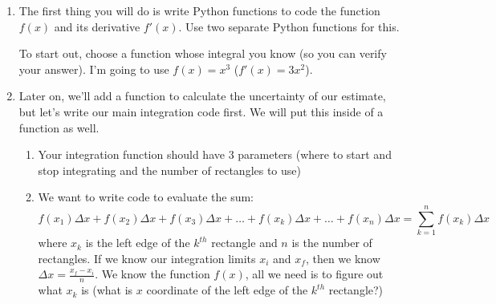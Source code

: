 \documentclass{article}
\begin{document}
\begin{enumerate}
	\item The first thing you will do is write Python functions to code the function $f(x)$ and its derivative $f'(x)$. Use two separate Python functions for this. 
	
	To start out, choose a function whose integral you know (so you can verify your answer). I'm going to use $f(x)=x^3$ ($f'(x)=3x^2$).
	\item Later on, we'll add a function to calculate the uncertainty of our estimate, but let's write our main integration code first. We will put this inside of a function as well.
	\begin{enumerate}
		\item Your integration function should have 3 parameters (where to start and stop integrating and the number of rectangles to use)
		\item We want to write code to evaluate the sum: 
		\begin{equation*}
			f(x_1)\Delta x + f(x_2)\Delta x + f(x_3)\Delta x+\ldots+f(x_k)\Delta x+\ldots+f(x_n)\Delta x = \sum_{k=1}^{n}f(x_k)\Delta x
		\end{equation*}
		where $x_k$ is the left edge of the $k^{th}$ rectangle and $n$ is the number of rectangles. If we know our integration limits $x_i$ and $x_f$, then we know $\Delta x=\frac{x_f-x_i}{n}$. We know the function $f(x)$, all we need is to figure out what $x_k$ is (what is $x$ coordinate of the left edge of the $k^{th}$ rectangle?)
		

\end{enumerate}
\end{enumerate}
\end{document}

